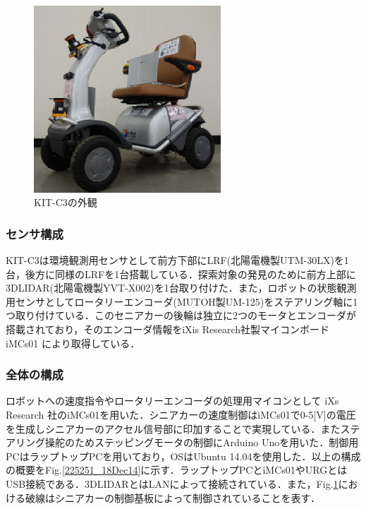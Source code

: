 \documentclass[10pt,a4paper]{jarticle}
\begin{document}
\begin{figure}
  \centering
  \includegraphics[width=7cm]{fig/eps/kitc3.eps}
  \caption{KIT-C3の外観}
  \label{213021_18Dec14}
\end{figure}

\subsubsection{センサ構成}
KIT-C3は環境観測用センサとして前方下部にLRF(北陽電機製UTM-30LX)を1台，後方に同様のLRFを1台搭載している．探索対象の発見のために前方上部に3DLIDAR(北陽電機製YVT-X002)を1台取り付けた．また，ロボットの状態観測用センサとしてロータリーエンコーダ(MUTOH製UM-125)をステアリング軸に1つ取り付けている．このセニアカーの後輪は独立に2つのモータとエンコーダが搭載されており，そのエンコーダ情報をiXis Research社製マイコンボード iMCs01 により取得している．

\subsubsection{全体の構成}
ロボットへの速度指令やロータリーエンコーダの処理用マイコンとして iXs Research 社のiMCs01を用いた．シニアカーの速度制御はiMCs01で0-5[V]の電圧を生成しシニアカーのアクセル信号部に印加することで実現している．またステアリング操舵のためステッピングモータの制御にArduino Unoを用いた．制御用PCはラップトップPCを用いており，OSはUbuntu 14.04を使用した．以上の構成の概要をFig.\ref{225251_18Dec14}に示す．ラップトップPCとiMCs01やURGとはUSB接続である．3DLIDARとはLANによって接続されている．また，Fig.\ref{213021_18Dec14}における破線はシニアカーの制御基板によって制御されていることを表す．
\end{document}
